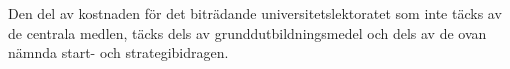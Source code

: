 \documentclass[11pt,a4paper]{article}
\begin{document}
Den del av kostnaden för det biträdande universitetslektoratet som inte täcks av de centrala medlen, täcks dels av grunddutbildningsmedel och dels av de ovan nämnda start- och strategibidragen. 



\end{document}
